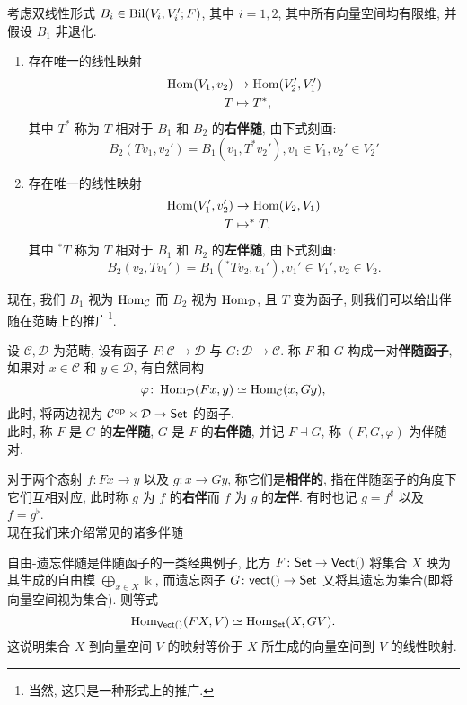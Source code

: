 \begin{definition}[线性映射的伴随映射]
    考虑双线性形式 $B_i \in \operatorname{Bil}(V_i,V_i';F)$, 其中 $i = 1,2$, 其中所有向量空间均有限维, 并假设 $B_1$ 非退化.
    \begin{enumerate}
        \item 存在唯一的线性映射
        \begin{align*}
            \operatorname{Hom}(V_1,v_2) &\to \operatorname{Hom}(V_2',V_1')\\
            T &\mapsto T^*,
        \end{align*}
        其中 $T^*$ 称为 $T$ 相对于 $B_1$ 和 $B_2$ 的\textbf{右伴随}, 由下式刻画:
        \[
        B_2(Tv_1,v_2') = B_1(v_1,T^* v_2'), v_1 \in V_1, v_2' \in V_2'
        \]
        \item 存在唯一的线性映射
        \begin{align*}
            \operatorname{Hom}(V_1',v_2') &\to \operatorname{Hom}(V_2,V_1)\\
            T &\mapsto ^*T,
        \end{align*}
        其中 $^* T$ 称为 $T$ 相对于 $B_1$ 和 $B_2$ 的\textbf{左伴随}, 由下式刻画:
        \[
        B_2(v_2,Tv_1') = B_1(^*Tv_2,v_1'), v_1'\in V_1', v_2 \in V_2.
        \]
    \end{enumerate}
\end{definition}
现在, 我们 $B_1$ 视为 $\operatorname{Hom}_{\cal{C}}$ 而 $B_2$ 视为 $\operatorname{Hom}_{\cal{D}}$, 且 $T$ 变为函子, 则我们可以给出伴随在范畴上的推广\footnote{当然, 这只是一种形式上的推广.}.
\begin{definition}[伴随函子]
    设 $\mathcal{C},\mathcal{D}$ 为范畴, 设有函子 $F \colon \mathcal{C} \to \mathcal{D}$ 与 $G \colon \mathcal{D} \to \mathcal{C}$. 称 $F$ 和 $G$ 构成一对\textbf{伴随函子}, 如果对 $x\in \mathcal{C}$ 和 $y \in \mathcal{D}$, 有自然同构
    \[
    \varphi \colon \operatorname{Hom}_{\mathcal{D}}(Fx,y) \simeq \operatorname{Hom}_{\mathcal{C}}(x,Gy),
    \]
    此时, 将两边视为 $\mathcal{C}^{\operatorname{op}} \times \mathcal{D} \to \mathsf{Set}$ 的函子.\\
    此时, 称 $F$ 是 $G$ 的\textbf{左伴随}, $G$ 是 $F$ 的\textbf{右伴随}, 并记 $F\dashv G$, 称 $(F,G,\varphi)$ 为伴随对.
\end{definition}
对于两个态射 $f \colon Fx \to y$ 以及 $g \colon x \to Gy$, 称它们是\textbf{相伴的}, 指在伴随函子的角度下它们互相对应, 此时称 $g$ 为 $f$ 的\textbf{右伴}而 $f$ 为 $g$ 的\textbf{左伴}. 有时也记 $g = f^{\sharp}$ 以及 $f = g^{\flat}$.\\
现在我们来介绍常见的诸多伴随
\begin{example}[自由-遗忘伴随]
    自由-遗忘伴随是伴随函子的一类经典例子, 比方 $F \colon \mathsf{Set} \to \mathsf{Vect}(\relax)$ 将集合 $X$ 映为其生成的自由模 $\bigoplus_{x\in X}\Bbbk$, 而遗忘函子 $G \colon \mathsf{vect}(\relax) \to \mathsf{Set}$ 又将其遗忘为集合(即将向量空间视为集合). 则等式
    \[
    \operatorname{Hom}_{\mathsf{Vect}(\relax)}(FX,V) \simeq \operatorname{Hom}_{\mathsf{Set}}(X,GV).
    \]
    这说明集合 $X$ 到向量空间 $V$ 的映射等价于 $X$ 所生成的向量空间到 $V$ 的线性映射.
\end{example}
